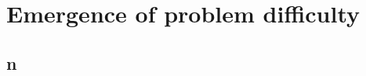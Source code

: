 \begin{comment}
\begin{figure}
\centering
\texttt{[image: figures/\{j.rnd]}/{trdat.prob.moveIsOptimal.10x10.feat.minmax}.pdf}
\caption{Probability of extremal feature being optimal for \jrnd}
\label{fig:diff:j.rnd:opt:minmax}
\end{figure}
\begin{figure}
\centering
\texttt{[image: figures/\{j.rndn]}/{trdat.prob.moveIsOptimal.10x10.feat.minmax}.pdf}
\caption{Probability of extremal feature being optimal for \jrndn}
\label{fig:diff:j.rndn:opt:minmax}
\end{figure}

\begin{figure}
\centering
\texttt{[image: figures/\{f.rnd]}/{trdat.prob.moveIsOptimal.10x10.feat.minmax}.pdf}
\caption{Probability of extremal feature being optimal for \frnd{10}{10}}
\label{fig:diff:f.rnd:opt:minmax}
\end{figure}
\end{comment}





\section{Emergence of problem difficulty}\label{sec:diff:stepwise}
\subsection{\Jrnd}\label{sec:easyhard:jrnd}
\subsection{\Jrndn}\label{sec:easyhard:jrndn}
\subsection{}\label{sec:easyhard:frnd}
\subsection{n}\label{sec:easyhard:frndn}
\subsection{\Fjc}\label{sec:easyhard:fjc}
